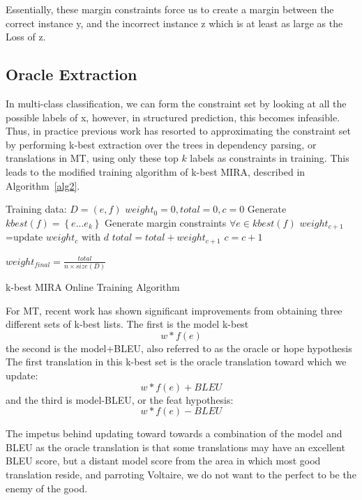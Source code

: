 Essentially, these margin constraints force us to create a margin between the correct instance y, and the incorrect instance z which is at least as large as the Loss of z.




\subsection{Oracle Extraction}
In multi-class classification, we can form the constraint set by looking at all the possible labels of x, however, in structured prediction, this becomes infeasible. Thus, in practice previous work has resorted to approximating the constraint set by performing k-best extraction over the trees in dependency parsing, or translations in MT, using only these top $k$ labels as constraints in training. This leads to the modified training algorithm of k-best MIRA, described in Algorithm~\ref{alg2}. 




\begin{algorithm}
\begin{algorithmic}
\STATE Training data: $D=(e,f)$
\STATE $weight_0=0, total=0, c=0$
  \STATE Generate $kbest(f) = \left\{e...e_k\right\}$
  \STATE Generate margin constraints $\forall e\in kbest(f)$
  \STATE $weight_{c+1}$=update $weight_c$ with $d$
  \STATE $total=total+weight_{c+1}$
  \STATE $c=c+1$
\ENDFOR
\ENDFOR

\STATE $weight_{final} = \frac{total}{n \times size(D)}$
\end{algorithmic}
\caption{k-best MIRA Online Training Algorithm}
\label{alg2}

\end{algorithm}

For MT, recent work has shown significant improvements from obtaining three different sets of k-best lists. The first is the model k-best
$$w*f(e) $$
 the second is the model+BLEU, also referred to as the oracle or hope hypothesis The first translation in this k-best set is the oracle translation toward which we update:
 $$w*f(e) + BLEU $$
 and the third is model-BLEU, or the feat hypothesis:
 $$w*f(e) - BLEU $$
 

The impetus behind updating toward towards a combination of the model and BLEU as the oracle translation is that some translations may have an excellent BLEU score, but a distant model score from the area in which most good translation reside, and parroting Voltaire, we do not want to the perfect to be the enemy of the good. 
 

